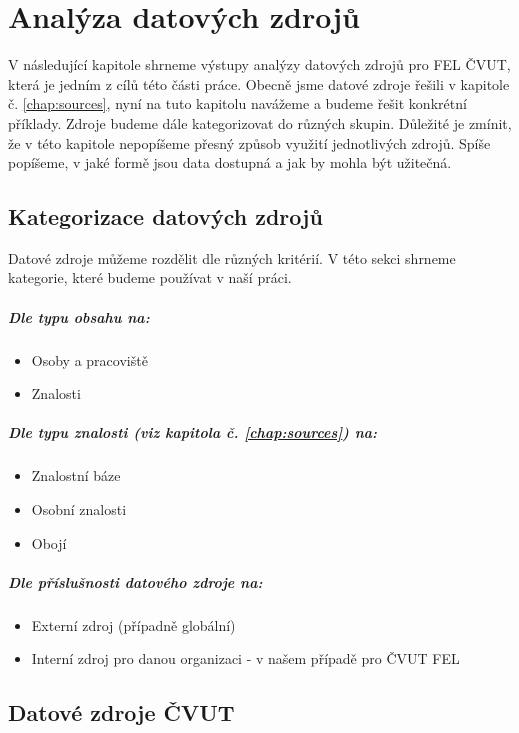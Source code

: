 \chapter{Analýza datových zdrojů} \label{chap:data-sources-analysis}
V následující kapitole shrneme výstupy analýzy datových zdrojů pro FEL ČVUT, která je jedním z cílů této části práce. Obecně jsme datové zdroje řešili v kapitole č. \ref{chap:sources}, nyní na tuto kapitolu navážeme a budeme řešit konkrétní příklady. Zdroje budeme dále kategorizovat do různých skupin. Důležité je zmínit, že v této kapitole nepopíšeme přesný způsob využití jednotlivých zdrojů. Spíše popíšeme, v jaké formě jsou data dostupná a jak by mohla být užitečná.\par
\section{Kategorizace datových zdrojů}
Datové zdroje můžeme rozdělit dle různých kritérií. V této sekci shrneme kategorie, které budeme používat v naší práci.
\paragraph{Dle typu obsahu na:}
\begin{itemize}
    \item Osoby a pracoviště
    \item Znalosti
\end{itemize}
\paragraph{Dle typu znalosti (viz kapitola č. \ref{chap:sources}) na:}
\begin{itemize}
    \item Znalostní báze
    \item Osobní znalosti
    \item Obojí
\end{itemize}
\paragraph{Dle příslušnosti datového zdroje na:}
\begin{itemize}
    \item Externí zdroj (případně globální)
    \item Interní zdroj pro danou organizaci - v našem případě pro ČVUT FEL
\end{itemize}

\section{Datové zdroje ČVUT}
